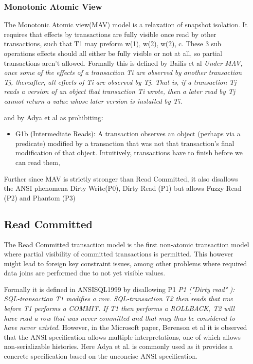 \documentclass[a4paper,10pt,titlepage]{report}
\begin{document}
    \subsubsection{Monotonic Atomic View}
    The Monotonic Atomic view(MAV) model is a relaxation of snapshot isolation. It requires that effects by transactions are fully visible once read by other transactions, such that T1 may preform w(1), w(2), w(2), c. These 3 sub operations effects should all either be fully visible or not at all, so partial transactions aren't allowed. Formally this is defined by Bailis et al \cite{HighlyAvailableTransactionsVirtuesandLimitations}
    \textit{Under MAV, once some of the effects of a transaction Ti are observed by another transaction Tj, thereafter, all effects of Ti are observed by Tj. That is, if a transaction Tj reads a version of an object that transaction Ti wrote, then a later read by Tj cannot return a value whose later version is installed by Ti.}

    and by Adya et al\cite{Adya99weakconsistency} as prohibiting:
    \begin{itemize}
        \item G1b (Intermediate Reads): A transaction observes an object (perhaps via a predicate) modified by a transaction that was not that transaction's final modification of that object. Intuitively, transactions have to finish before we can read them,
    \end{itemize}

    Further since MAV is strictly stronger than Read Committed, it also disallows the ANSI phenomena Dirty Write(P0), Dirty Read (P1) but allows Fuzzy Read (P2) and Phantom (P3)

    \subsection{Read Committed}
    The Read Committed transaction model is the first non-atomic transaction model where partial visibility of committed transactions is permitted. This however might lead to foreign key constraint issues, among other problems where required data joins are performed due to not yet visible values.
\\ \vspace{5mm}

    Formally it is defined in ANSISQL1999\cite{ansisql1999} by disallowing P1
    \textit{P1 ("Dirty read" ): SQL-transaction T1 modifies a row. SQL-transaction T2 then reads that row before T1 performs a COMMIT. If T1 then performs a ROLLBACK, T2 will have read a row that was never committed and that may thus be considered to have never existed.} However, in the Microsoft paper, Berenson et al \cite{Berensonetal} it is observed that the ANSI specification allows multiple interpretations, one of which allows non-serializable histories. Here Adya et al.\cite{Adya99weakconsistency} is commonly used as it provides a concrete specification based on the unconcise ANSI specification.
\\ \vspace{5mm}
\end{document}

